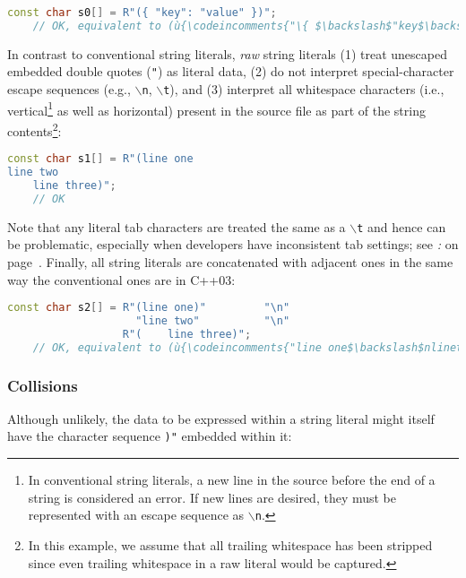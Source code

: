 \begin{lstlisting}[language=C++]
const char s0[] = R"({ "key": "value" })";
    // OK, equivalent to (ù{\codeincomments{"\{ $\backslash$"key$\backslash$": $\backslash$"value$\backslash$" \}"}}ù)
\end{lstlisting}

\noindent In contrast to conventional string literals, \emph{raw} string literals
(1) treat unescaped embedded double quotes (\texttt{"}) as literal data,
(2) do not interpret special-character escape sequences (e.g.,
\texttt{$\backslash$n}, \texttt{$\backslash$t}), and (3) interpret all
whitespace characters (i.e., vertical\footnote{In conventional string literals, a
new line in the source before the end of a string is considered an error.
If new lines are desired, they must be represented with an escape
sequence as \texttt{$\backslash$n}.} as well as horizontal) present in
the source file as part of the string contents{\cprotect\footnote{In
this example, we assume that all trailing whitespace has been stripped
since even trailing whitespace in a raw literal would be captured.}}:


\begin{lstlisting}[language=C++]
const char s1[] = R"(line one
line two
    line three)";
    // OK
\end{lstlisting}

\noindent Note that any literal tab characters are treated the same as a
\texttt{$\backslash$t} and hence can be problematic, especially when
developers have inconsistent tab settings; see \textit{: } on page~\pageref{unexpected-indentation}. Finally, all string literals are concatenated with
adjacent ones in the same way the conventional ones are in C++03:

\begin{lstlisting}[language=C++]
const char s2[] = R"(line one)"         "\n"
                    "line two"          "\n"
                  R"(    line three)";
    // OK, equivalent to (ù{\codeincomments{"line one$\backslash$nlinetwo$\backslash$n~~~~line three"}}ù)
\end{lstlisting}


\subsubsection[Collisions]{Collisions}\label{collisions}

Although unlikely, the data to be expressed within a
string literal might itself have the character sequence \texttt{)"}
embedded within it:

